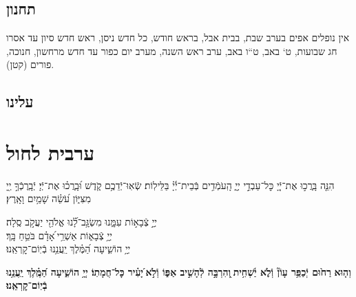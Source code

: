 \documentclass[twoside, openany, parskip=half, 11pt]{book}
\begin{document}
\section*{ תחנון }

\begin{scriptsize}
\textsf{אין נופלים אפים בערב שבת, בבית אבל, בראש חודש, כל חדש ניסן, ראש חדש סיון עד אסרו חג שבועות, ט` באב, ט``ו באב, ערב ראש השנה, מערב יום כפור עד חדש מרחשון, חנוכה, פורים (קטן).}

\end{scriptsize}


\nefilasapayim

\nextpage
\shomeryisroel

\fullkaddish

\vspace{\baselineskip}

\label{mincha aleinu}
\section*{ עלינו }


\aleinu


\vfill

\quad{}\quad{}

\chapter[ערבית לחול]{ ערבית לחול }

הִנֵּ֤ה בָּֽרֲכ֣וּ אֶת־יְֿ֖יָ כׇּל־עַבְדֵ֣י יְיָ֑ הָֽעֹמְֿדִ֥ים בְּֿבֵית־יְֿ֜יָ֗ בַּלֵּילֽוֹת׃ שְֿׂאֽוּ־יְֿדֵכֶ֥ם קֹ֑דֶשׁ וּ֝בָֽרֲכ֗וּ אֶת־יְֿיָ׃ יְֿבָֽרֶכְֿךָ֣ יְ֖יָ מִצִּיּ֑וֹן עֹ֝שֵׂ֗ה שָׁמַ֥יִם וָאָֽרֶץ׃

יְיָ֣ צְֿבָא֣וֹת עִמָּ֑נוּ מִשְׂגָּ֥ב־לָ֝֗נוּ אֱלֹהֵ֖י יַעֲקֹ֣ב סֶֽלָה׃  \hfill
{} \\
יְיָ֥ צְֿבָא֑וֹת אַשְׁרֵ֥י ֝אָדָ֗ם בֹּטֵ֥חַ בָּֽךְ׃  \hfill
{} \\
יְיָ֥ הוֹשִׁ֑יעָה הַ֝מֶּ֗לֶךְ יַֽעֲנֵ֥נוּ בְֿיֽוֹם־קׇרְאֵֽנוּ׃  \hfill {}


\halfkaddish


\textbf{וְה֤וּא}\textbf{
רַח֙וּם יְֿכַפֵּ֥ר עָוֹן֘ וְֿלֹ֢א יַ֫שְׁחִ֥ית ֖וְהִרְבָּ֣ה לְֿהָשִׁ֣יב אַפּ֑וֹ וְֿלֹ֣א ֝יָעִ֗יר כׇּל־חֲמָתֽוֹ׃ יְיָ֥ הוֹשִׁ֑יעָה הַ֝מֶּֽ֗לֶךְ יַֽעֲנֵ֥נוּ בְֿיֽוֹם־קׇרְאֵֽנוּ׃}
\end{document}
